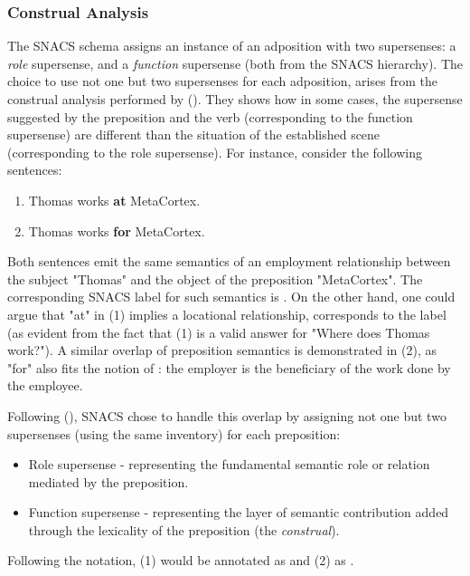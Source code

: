 \subsubsection{Construal Analysis} \label{sec:construal}

The SNACS schema assigns an instance of an adposition with two supersenses: a \textit{role} supersense, and a \textit{function} supersense (both from the SNACS hierarchy). The choice to use not one but two supersenses for each adposition, arises from the construal analysis performed by (\cite{hwang-17}). They shows how in some cases, the supersense suggested by the preposition and the verb (corresponding to the function supersense) are different than the situation of the established scene (corresponding to the role supersense). For instance, consider the following sentences:

\begin{enumerate}
    \item Thomas works \textbf{at} MetaCortex.
    \item Thomas works \textbf{for} MetaCortex.
\end{enumerate}

Both sentences emit the same semantics of an employment relationship between the subject "Thomas" and the object of the preposition "MetaCortex". The corresponding SNACS label for such semantics is . On the other hand, one could argue that "at" in (1) implies a locational relationship, corresponds to the  label (as evident from the fact that (1) is a valid answer for "Where does Thomas work?"). A similar overlap of preposition semantics is demonstrated in (2), as "for" also fits the notion of : the employer is the beneficiary of the work done by the employee. 

Following (\cite{hwang-17}), SNACS chose to handle this overlap by assigning not one but two supersenses (using the same inventory) for each preposition:

\begin{itemize}
    \item Role supersense - representing the fundamental semantic role or relation mediated by the preposition.
    \item Function supersense - representing the layer of semantic contribution added through the lexicality of the preposition (the \textit{construal}).
\end{itemize}

Following the  notation, (1) would be annotated as  and (2) as .

